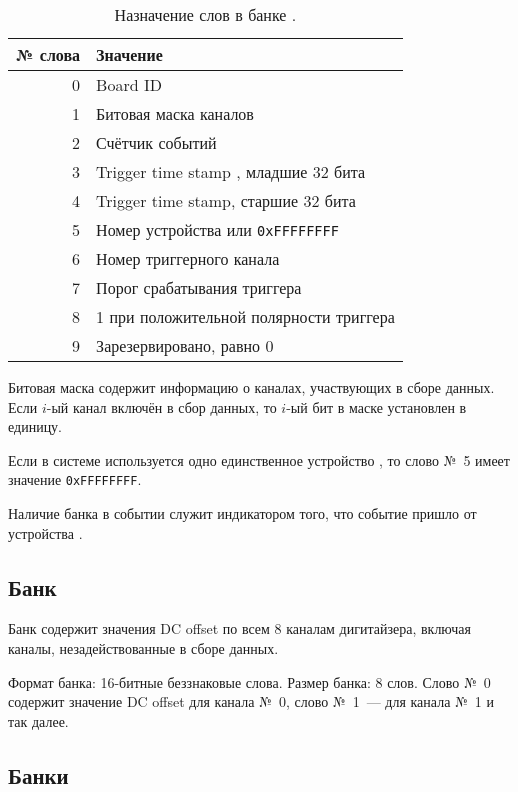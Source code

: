 \begin{table}[h]
\centering
\begin{tabular}{rl}
\hline\hline
№ слова & Значение \\
\hline

0 & Board ID \\
1 & Битовая маска каналов \\
2 & Счётчик событий \\
3 & Trigger time stamp \cite{CaenUM3051TS}, младшие 32 бита \\
4 & Trigger time stamp, старшие 32 бита \\
5 & Номер устройства или {\tt 0xFFFFFFFF} \\
6 & Номер триггерного канала \\
7 & Порог срабатывания триггера \\
8 & 1 при положительной полярности триггера \\
9 & Зарезервировано, равно 0 \\

\hline\hline
\end{tabular}
\caption{Назначение слов в банке .}
\label{tab-info-bank}
\end{table}

Битовая маска содержит информацию о каналах, участвующих в сборе данных. Если $i$-ый канал включён в сбор данных, то $i$-ый бит в маске установлен в единицу.

Если в системе используется одно единственное устройство \DEVICE{}, то слово №~5 имеет значение {\tt 0xFFFFFFFF}.

Наличие банка  в событии служит индикатором того, что событие пришло от устройства \DEVICE{}.

\subsection{Банк }

Банк содержит значения DC offset \cite{CaenUM3051AIS} по всем 8 каналам дигитайзера, включая каналы, незадействованные в сборе данных.

Формат банка: 16-битные беззнаковые слова. Размер банка: 8 слов. Слово №~0 содержит значение DC offset для канала №~0, слово №~1~--- для канала №~1 и так далее.

\subsection{Банки }

